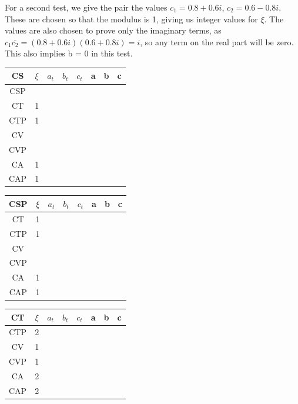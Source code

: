 \documentclass[twocolumn]{article}
\begin{document}
For a second test, we give the pair the values $c_1 = 0.8 + 0.6i$, $c_2 = 0.6 - 0.8i$. These are chosen so that the modulus is 1, giving us integer values for $\xi$. The values are also chosen to prove only the imaginary terms, as $c_1\overline{c_2} = (0.8+0.6i)(0.6+0.8i) = i$, so any term on the real part will be zero. This also implies b = 0  in this test.

\begin{table}[H]
	\begin{tabular}{|c|c|c|c|c|c|c|c|}
		\hline
		CS & $\xi $& $a_t$ & $b_t$ & $c_t$ & a & b & c \\
		\hline
		CSP &   &   &   &   &   &   &   \\
		\hline
		CT & 1 &   &   &   &   &   &   \\
		\hline
		CTP & 1 &   &   &   &   &   &   \\
		\hline
		CV &   &   &   &   &   &   &   \\
		\hline
		CVP &   &   &   &   &   &   &   \\
		\hline
		CA & 1 &   &   &   &   &   &   \\
		\hline
		CAP & 1 &   &   &   &   &   &   \\
		\hline
	\end{tabular}
\end{table}

\begin{table}[H]
	\begin{tabular}{|c|c|c|c|c|c|c|c|}
		\hline
		CSP & $\xi $& $a_t$ & $b_t$ & $c_t$ & a & b & c \\
		\hline
		CT & 1 &   &   &   &   &   &   \\
		\hline
		CTP & 1 &   &   &   &   &   &   \\
		\hline
		CV &   &   &   &   &   &   &   \\
		\hline
		CVP &   &   &   &   &   &   &   \\
		\hline
		CA & 1 &   &   &   &   &   &   \\
		\hline
		CAP & 1 &   &   &   &   &   &   \\
		\hline
	\end{tabular}
\end{table}

\begin{table}[H]
	\begin{tabular}{|c|c|c|c|c|c|c|c|}
		\hline
		CT & $\xi $& $a_t$ & $b_t$ & $c_t$ & a & b & c \\
		\hline
		CTP & 2 &   &   &   &   &   &   \\
		\hline
		CV & 1 &   &   &   &   &   &   \\
		\hline
		CVP & 1 &   &   &   &   &   &   \\
		\hline
		CA & 2 &   &   &   &   &   &   \\
		\hline
		CAP & 2 &   &   &   &   &   &   \\
		\hline
	\end{tabular}
\end{table}
\end{document}

